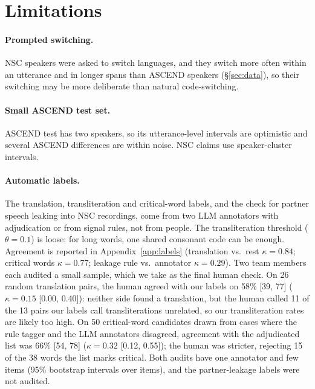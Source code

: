 \section*{Limitations}
\label{sec:limitations}

\paragraph{Prompted switching.} NSC speakers were asked to switch languages, and they switch more often within an utterance and in longer spans than ASCEND speakers (\S\ref{sec:data}), so their switching may be more deliberate than natural code-switching.

\paragraph{Small ASCEND test set.} ASCEND test has two speakers, so its utterance-level intervals are optimistic and several ASCEND differences are within noise. NSC claims use speaker-cluster intervals.

\paragraph{Automatic labels.} The translation, transliteration and critical-word labels, and the check for partner speech leaking into NSC recordings, come from two LLM annotators with adjudication or from signal rules, not from people. The transliteration threshold ($\theta=0.1$) is loose: for long words, one shared consonant code can be enough. Agreement is reported in Appendix~\ref{app:labels} (translation vs.\ rest $\kappa=0.84$; critical words $\kappa=0.77$; leakage rule vs.\ annotator $\kappa=0.29$). Two team members each audited a small sample, which we take as the final human check. On 26 random translation pairs, the human agreed with our labels on 58\% [39, 77] ($\kappa=0.15$ [0.00, 0.40]): neither side found a translation, but the human called 11 of the 13 pairs our labels call transliterations unrelated, so our transliteration rates are likely too high. On 50 critical-word candidates drawn from cases where the rule tagger and the LLM annotators disagreed, agreement with the adjudicated list was 66\% [54, 78] ($\kappa=0.32$ [0.12, 0.55]); the human was stricter, rejecting 15 of the 38 words the list marks critical. Both audits have one annotator and few items (95\% bootstrap intervals over items), and the partner-leakage labels were not audited.

